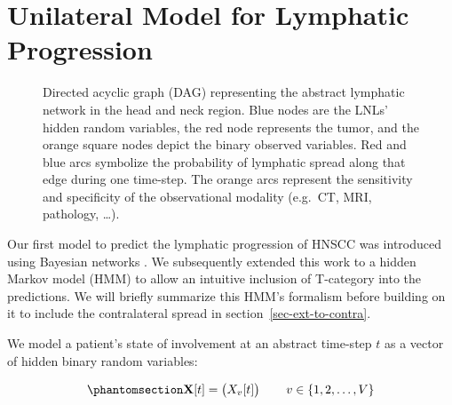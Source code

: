 \documentclass[
  sn-mathphys-num,
]{sn-jnl}
\begin{document}
\section{Unilateral Model for Lymphatic
Progression}\label{sec-unilateral}

\begin{figure}


\caption{\label{fig-small-graph}Directed acyclic graph (DAG)
representing the abstract lymphatic network in the head and neck region.
Blue nodes are the LNLs' hidden random variables, the red node
represents the tumor, and the orange square nodes depict the binary
observed variables. Red and blue arcs symbolize the probability of
lymphatic spread along that edge during one time-step. The orange arcs
represent the sensitivity and specificity of the observational modality
(e.g.~CT, MRI, pathology, \ldots).}

\end{figure}%

Our first model to predict the lymphatic progression of HNSCC was
introduced using Bayesian networks \citep{pouymayou_bayesian_2019}. We
subsequently extended this work to a hidden Markov model (HMM)
\citep{ludwig_hidden_2021} to allow an intuitive inclusion of T-category
into the predictions. We will briefly summarize this HMM's formalism
before building on it to include the contralateral spread in
section~\ref{sec-ext-to-contra}.

We model a patient's state of involvement at an abstract time-step \(t\)
as a vector of hidden binary random variables:

\begin{equation}\phantomsection\label{eq-state-def}{
\mathbf{X}[t] = \begin{pmatrix} X_v[t] \end{pmatrix} \qquad v \in \left\{ 1, 2, \ldots, V \right\}
}\end{equation}
\end{document}
